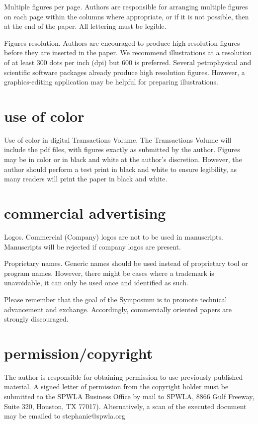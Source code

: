 \documentclass[10pt,twocolumn,twoside]{article}
\begin{document}
Multiple figures per page. Authors are responsible for arranging multiple figures on each page within the columns where appropriate, or if it is not possible, then at the end of the paper. All lettering must be legible.

Figures resolution. Authors are encouraged to produce high resolution figures before they are inserted in the paper. We recommend illustrations at a resolution of at least 300 dots per inch (dpi) but 600 is preferred. Several petrophysical and scientific software packages already produce high resolution figures. However, a graphics-editing application may be helpful for preparing illustrations. 

\section{use of color}
Use of color in digital Transactions Volume. The Transactions Volume will include the pdf files, with figures exactly as submitted by the author. Figures may be in color or in black and white at the author’s discretion. However, the author should perform a test print in black and white to ensure legibility, as many readers will print the paper in black and white. 

\section{commercial advertising}
Logos. Commercial (Company) logos are not to be used in manuscripts.  Manuscripts will be rejected if company logos are present. 

Proprietary names. Generic names should be used instead of proprietary tool or program names. However, there might be cases where a trademark is unavoidable, it can only be used once and identified as such.

Please remember that the goal of the Symposium is to promote technical advancement and exchange. Accordingly, commercially oriented papers are strongly discouraged.

\section{permission/copyright}
The author is responsible for obtaining permission to use previously published material. A signed letter of permission from the copyright holder must be submitted to the SPWLA Business Office by mail to SPWLA, 8866 Gulf Freeway, Suite 320, Houston, TX 77017). Alternatively, a scan of the executed document may be emailed to stephanie@spwla.org 
\end{document}
